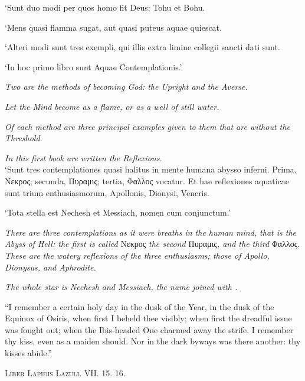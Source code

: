 {
\raggedbottom
{}

{

\begin{sloppypar}
`Sunt duo modi per quos homo fit Deus: Tohu et Bohu.

`Mens quasi flamma sugat, aut quasi puteus aquae quiescat.

`Alteri modi sunt tres exempli, qui illis extra limine collegii sancti dati sunt.

`In hoc primo libro sunt Aquae Contemplationis.'

\textit{Two are the methods of becoming God: the Upright and the Averse.}

\textit{Let the Mind become as a flame, or as a well of still water.}

\textit{Of each method are three principal examples given to them that are without the Threshold.}

\textit{In this first book are written the Reflexions.} \\

`Sunt tres contemplationes quasi halitus in mente humana abysso inferni. Prima, Νεκρος; secunda, Πυραμις; tertia, Φαλλος vocatur. Et hae reflexiones aquaticae sunt trium enthusiasmorum, Apollonis, Dionysi, Veneris.

`Tota stella est Nechesh et Messiach, nomen  cum  conjunctum.'

\textit{There are three contemplations as it were breaths in the human mind, that is the Abyss of Hell: the first is called }Νεκρος\textit{ the second }Πυραμις\textit{, and the third }Φαλλος.\textit{ These are the watery reflexions of the three enthusiasms; those of Apollo, Dionysus, and Aphrodite.}

\textit{The whole star is Nechesh and Messiach, the name  joined with .}
\end{sloppypar}

}
}

\pagebreak
{}




\epigraph{\enquote{I remember a certain holy day in the dusk of the Year, in the dusk of the Equinox of Osiris, when first I beheld thee visibly; when first the dreadful issue was fought out; when the Ibis-headed One charmed away the strife. I remember thy kiss, even as a maiden should. Nor in the dark byways was there another: thy kisses abide.}}{\textsc{Liber Lapidis Lazuli. VII. 15. 16.}}


